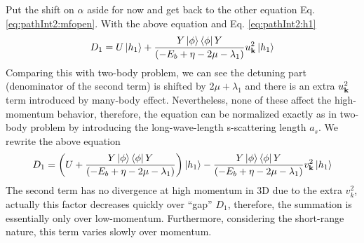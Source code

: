 Put the shift on $\alpha$ aside for now and get back to the other equation Eq. \ref{eq:pathInt2:mfopen}.  With the above equation and Eq. \ref{eq:pathInt2:h1}
\begin{equation*}
D_{1}=U\left|h_{1}\right>+\frac{Y\left|\phi\right>\left<\phi\right|{Y}}{\left(-E_{b}+\eta-2\mu-\lambda_{1}\right)}u_{\mathbf{k}}^{2}\left|{h_{1}}\right>
\end{equation*}
Comparing this with two-body problem, we can see the detuning part (denominator of the second term) is shifted by $2\mu+\lambda_{1}$ and there is an extra $u_{\mathbf{k}}^{2}$ term introduced by many-body effect.  Nevertheless, none of these affect the high-momentum behavior, therefore, the equation can be normalized exactly as in two-body problem by introducing the long-wave-length s-scattering length $a_{s}$.  We rewrite the above equation
\begin{equation*}
D_{1}=\left(U+\frac{Y\left|\phi\right>\left<\phi\right|{Y}}{\left(-E_{b}+\eta-2\mu-\lambda_{1}\right)}\right)\left|{h_{1}}\right>
	-\frac{Y\left|\phi\right>\left<\phi\right|{Y}}{\left(-E_{b}+\eta-2\mu-\lambda_{1}\right)}v_{\mathbf{k}}^{2}\left|{h_{1}}\right>
\end{equation*}
The second term has no divergence at high momentum in 3D due to the extra $v_{k}^{2}$, actually this factor decreases quickly over ``gap'' $D_{1}$, therefore, the summation is essentially only over low-momentum.   Furthermore, considering the short-range nature, this term varies slowly over momentum.  

